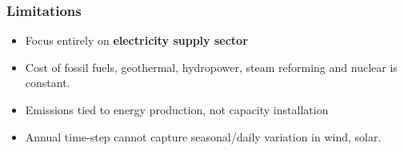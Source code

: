 \begin{frame}
  \frametitle{Limitations}
        \begin{itemize}
        
         \item Focus entirely on \textbf{electricity supply sector}        
         
         \item Cost of fossil fuels, geothermal, hydropower, steam reforming and nuclear is constant.
         
         \item Emissions tied to energy production, not capacity installation
         
         \item Annual time-step cannot capture seasonal/daily variation in wind, solar.
        
        \end{itemize}

\end{frame}
